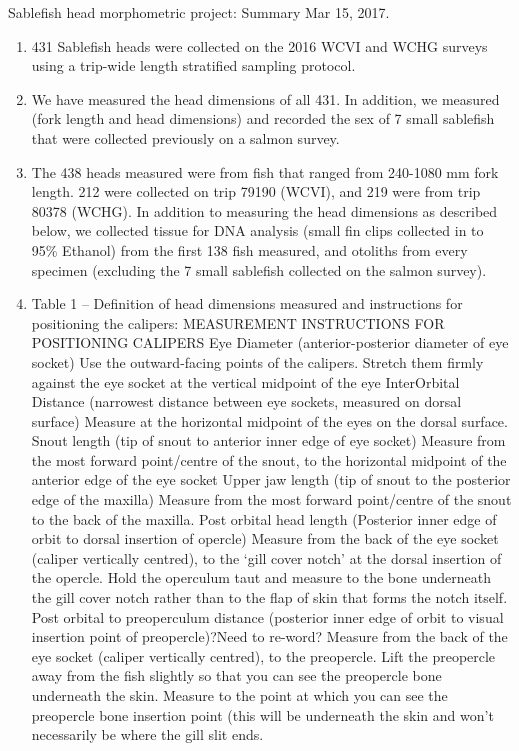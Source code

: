 \documentclass[12pt]{article}\usepackage[]{graphicx}\usepackage[]{color}
\begin{document}
Sablefish head morphometric project: Summary Mar 15, 2017.
\begin{enumerate}
\def\labelenumi{\arabic{enumi}.}
\item
  431 Sablefish heads were collected on the 2016 WCVI and WCHG surveys using a trip-wide length stratified sampling protocol.
\item
  We have measured the head dimensions of all 431. In addition, we measured (fork length and head dimensions) and recorded the sex of 7 small sablefish that were collected previously on a salmon survey.
\item
  The 438 heads measured were from fish that ranged from 240-1080 mm fork length. 212 were collected on trip 79190 (WCVI), and 219 were from trip 80378 (WCHG). In addition to measuring the head dimensions as described below, we collected tissue for DNA analysis (small fin clips collected in to 95\% Ethanol) from the first 138 fish measured, and otoliths from every specimen (excluding the 7 small sablefish collected on the salmon survey).
\item
  Table 1 -- Definition of head dimensions measured and instructions for positioning the calipers: MEASUREMENT INSTRUCTIONS FOR POSITIONING CALIPERS Eye Diameter (anterior-posterior diameter of eye socket) Use the outward-facing points of the calipers. Stretch them firmly against the eye socket at the vertical midpoint of the eye InterOrbital Distance (narrowest distance between eye sockets, measured on dorsal surface) Measure at the horizontal midpoint of the eyes on the dorsal surface. Snout length (tip of snout to anterior inner edge of eye socket) Measure from the most forward point/centre of the snout, to the horizontal midpoint of the anterior edge of the eye socket Upper jaw length (tip of snout to the posterior edge of the maxilla) Measure from the most forward point/centre of the snout to the back of the maxilla. Post orbital head length (Posterior inner edge of orbit to dorsal insertion of opercle) Measure from the back of the eye socket (caliper vertically centred), to the `gill cover notch' at the dorsal insertion of the opercle. Hold the operculum taut and measure to the bone underneath the gill cover notch rather than to the flap of skin that forms the notch itself. Post orbital to preoperculum distance (posterior inner edge of orbit to visual insertion point of preopercle)?Need to re-word? Measure from the back of the eye socket (caliper vertically centred), to the preopercle. Lift the preopercle away from the fish slightly so that you can see the preopercle bone underneath the skin. Measure to the point at which you can see the preopercle bone insertion point (this will be underneath the skin and won't necessarily be where the gill slit ends.
\end{enumerate}
\end{document}
